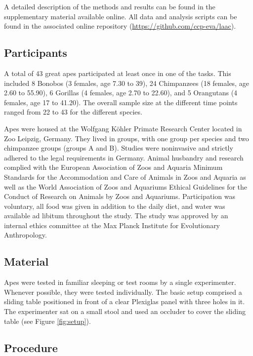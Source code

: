 \documentclass[
  man,floatsintext]{apa6}
\begin{document}
A detailed description of the methods and results can be found in the supplementary material available online. All data and analysis scripts can be found in the associated online repository (\url{https://github.com/ccp-eva/laac}).

\hypertarget{participants}{%
\subsection{Participants}\label{participants}}

A total of 43 great apes participated at least once in one of the tasks. This included 8 Bonobos (3 females, age 7.30 to 39), 24 Chimpanzees (18 females, age 2.60 to 55.90), 6 Gorillas (4 females, age 2.70 to 22.60), and 5 Orangutans (4 females, age 17 to 41.20). The overall sample size at the different time points ranged from 22 to 43 for the different species.

Apes were housed at the Wolfgang Köhler Primate Research Center located in Zoo Leipzig, Germany. They lived in groups, with one group per species and two chimpanzee groups (groups A and B). Studies were noninvasive and strictly adhered to the legal requirements in Germany. Animal husbandry and research complied with the European Association of Zoos and Aquaria Minimum Standards for the Accommodation and Care of Animals in Zoos and Aquaria as well as the World Association of Zoos and Aquariums Ethical Guidelines for the Conduct of Research on Animals by Zoos and Aquariums. Participation was voluntary, all food was given in addition to the daily diet, and water was available ad libitum throughout the study. The study was approved by an internal ethics committee at the Max Planck Institute for Evolutionary Anthropology.

\hypertarget{material}{%
\subsection{Material}\label{material}}

Apes were tested in familiar sleeping or test rooms by a single experimenter. Whenever possible, they were tested individually. The basic setup comprised a sliding table positioned in front of a clear Plexiglas panel with three holes in it. The experimenter sat on a small stool and used an occluder to cover the sliding table (see Figure \ref{fig:setup}).

\hypertarget{procedure}{%
\subsection{Procedure}\label{procedure}}
\end{document}
